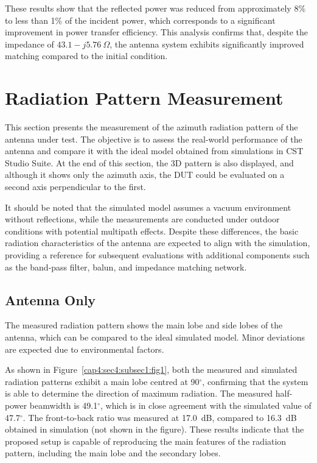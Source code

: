 These results show that the reflected power was reduced from approximately 8\% to less than 1\% of the incident power, 
which corresponds to a significant improvement in power transfer efficiency. This analysis confirms that, despite the impedance of $43.1-j5.76 \ \Omega$, the antenna system exhibits significantly improved matching compared to the initial condition.


\section{Radiation Pattern Measurement}

This section presents the measurement of the azimuth radiation pattern of the antenna under test. The objective is to assess the real-world performance of the antenna and compare it with the ideal model obtained from simulations in CST Studio Suite. At the end of this section, the 3D pattern is also displayed, and although it shows only the azimuth axis, the DUT could be evaluated on a second axis perpendicular to the first.

It should be noted that the simulated model assumes a vacuum environment without reflections, while the measurements are conducted under outdoor conditions with potential multipath effects. Despite these differences, the basic radiation characteristics of the antenna are expected to align with the simulation, providing a reference for subsequent evaluations with additional components such as the band-pass filter, balun, and impedance matching network.

\subsection{Antenna Only}

The measured radiation pattern shows the main lobe and side lobes of the antenna, which can be compared to the ideal simulated model. Minor deviations are expected due to environmental factors. 

As shown in Figure~\ref{cap4:sec4:subsec1:fig1}, both the measured and simulated radiation patterns exhibit a main lobe centred at 90$^{\circ}$, confirming that the system is able to determine the direction of maximum radiation. The measured half-power beamwidth is 49.1$^{\circ}$, which is in close agreement with the simulated value of 47.7$^{\circ}$. The front-to-back ratio was measured at 17.0~dB, compared to 16.3~dB obtained in simulation (not shown in the figure). These results indicate that the proposed setup is capable of reproducing the main features of the radiation pattern, including the main lobe and the secondary lobes.

